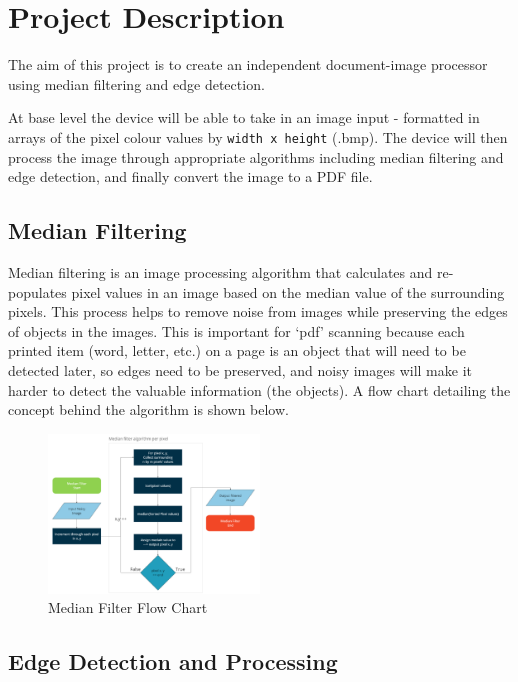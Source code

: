 \documentclass{article}
\begin{document}
\section*{Project Description}
The aim of this project is to create an independent document-image processor using median filtering and edge detection. 

At base level the device will be able to take in an image input - formatted in arrays of the pixel colour values by 
\texttt{width x height} (.bmp). The device will then process the image through appropriate algorithms including median filtering and edge 
detection, and finally convert the image to a PDF file.

\subsection*{Median Filtering}
Median filtering is an image processing algorithm that calculates and re-populates pixel values in an image based on the 
median value of the surrounding pixels. This process helps to remove noise from images while preserving the edges of objects 
in the images. This is important for ‘pdf’ scanning because each printed item (word, letter, etc.) on a page is an object that 
will need to be detected later, so edges need to be preserved, and noisy images will make it harder to detect the valuable information 
(the objects). A flow chart detailing the concept behind the algorithm is shown below. 

\begin{figure}[H]
    \centering
    \includegraphics[width=0.5\textwidth]{Images/Median_Filter_Block_Diagram.png}
    \caption{Median Filter Flow Chart}
    \label{fig:Figure 2}
\end{figure}

\subsection*{Edge Detection and Processing}
\end{document}
